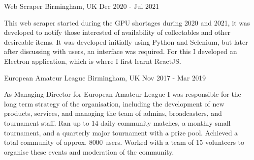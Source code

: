 

\begin{cventries}

  \cventry
    {}
    {Web Scraper} %
    {Birmingham, UK} %
    {Dec 2020 - Jul 2021} %
    {
      \begin{cvitems}
        This web scraper started during the GPU shortages during 2020 and 2021, it was developed to notify those interested of availability of collectables and other desireable items. It was developed initially using Python and Selenium, but later after discussing with users, an interface was required. For this I developed an Electron application, which is where I first learnt ReactJS.
      \end{cvitems}
    }

  \cventry
    {}
    {European Amateur League} %
    {Birmingham, UK} %
    {Nov 2017 - Mar 2019} %
    {
      \begin{cvitems}
        As Managing Director for European Amateur League I was responsible for the long term strategy of the organisation, including the development of new products, services, and managing the team of admins, broadcasters, and tournament staff. Ran up to 14 daily community matches, a monthly small tournament, and a quarterly major tournament with a prize pool. Achieved a total community of approx. 8000 users. Worked with a team of 15 volunteers to organise these events and moderation of the community. 
      \end{cvitems}
    }

\end{cventries}
